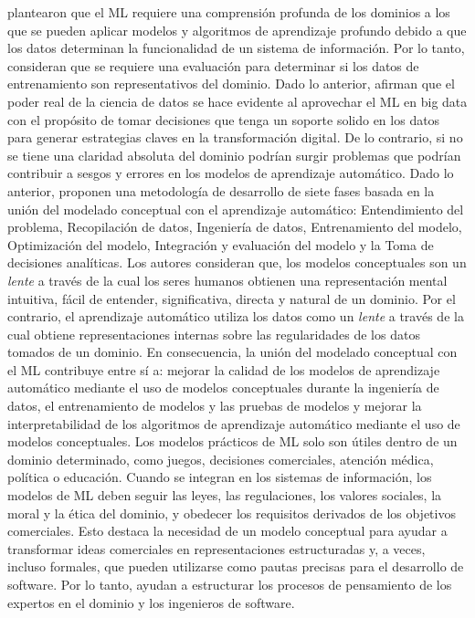 \cite{Maass2021} plantearon que el ML requiere una comprensión profunda de los dominios a los que se pueden aplicar modelos y algoritmos de aprendizaje profundo debido a que los datos determinan la funcionalidad de un sistema de información. Por lo tanto, consideran que se requiere una evaluación para determinar si los datos de entrenamiento son representativos del dominio. Dado lo anterior, afirman que el poder real de la ciencia de datos se hace evidente al aprovechar el ML en big data con el propósito de tomar decisiones que tenga un soporte solido en los datos para generar estrategias claves en la transformación digital. De lo contrario, si no se tiene una claridad absoluta del dominio podrían surgir problemas que podrían contribuir a sesgos y errores en los modelos de aprendizaje automático. Dado lo anterior, proponen una metodología de desarrollo de siete fases basada en la unión del modelado conceptual con el aprendizaje automático: Entendimiento del problema, Recopilación de datos, Ingeniería de datos, Entrenamiento del modelo, Optimización del modelo, Integración y evaluación del modelo y la Toma de decisiones analíticas. Los autores consideran que, los modelos conceptuales son un \textit{lente} a través de la cual los seres humanos obtienen una representación mental intuitiva, fácil de entender, significativa, directa y natural de un dominio. Por el contrario, el aprendizaje automático utiliza los datos como un \textit{lente} a través de la cual obtiene representaciones internas sobre las regularidades de los datos tomados de un dominio. En consecuencia, la unión del modelado conceptual con el ML contribuye entre sí a: mejorar la calidad de los modelos de aprendizaje automático mediante el uso de modelos conceptuales durante la ingeniería de datos, el entrenamiento de modelos y las pruebas de modelos y mejorar la interpretabilidad de los algoritmos de aprendizaje automático mediante el uso de modelos conceptuales. Los modelos prácticos de ML solo son útiles dentro de un dominio determinado, como juegos, decisiones comerciales, atención médica, política o educación. Cuando se integran en los sistemas de información, los modelos de ML deben seguir las leyes, las regulaciones, los valores sociales, la moral y la ética del dominio, y obedecer los requisitos derivados de los objetivos comerciales. Esto destaca la necesidad de un modelo conceptual para ayudar a transformar ideas comerciales en representaciones estructuradas y, a veces, incluso formales, que pueden utilizarse como pautas precisas para el desarrollo de software. Por lo tanto, ayudan a estructurar los procesos de pensamiento de los expertos en el dominio y los ingenieros de software.  

